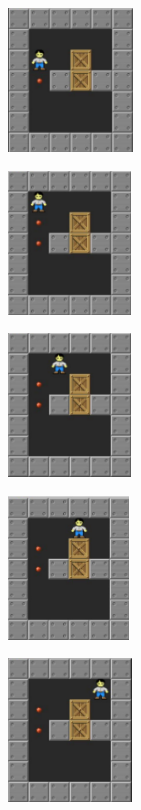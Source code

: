 \documentclass[10pt, final]{article}
\begin{document}
			\begin{figure}[h!]
		{
			\begin{subfigure}[h!]{1.3in}
				\includegraphics[height=1.5in]{p6.png}
			\end{subfigure}
			\begin{subfigure}[h!]{1.3in}
				\includegraphics[height=1.5in]{p7.png}
			\end{subfigure}
			\begin{subfigure}[h!]{1.3in}
				\includegraphics[height=1.5in]{p8.png}
			\end{subfigure}
			\begin{subfigure}[h!]{1.3in}
				\includegraphics[height=1.5in]{p9.png}
			\end{subfigure}
			\begin{subfigure}[h!]{1.3in}
				\includegraphics[height=1.5in]{p10.png}
		\end{subfigure}}
		\label{fig:chain}
	\end{figure}
\end{document}
